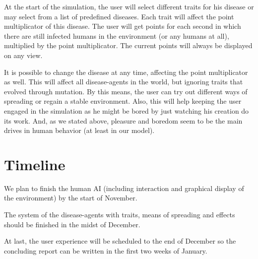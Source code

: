 \documentclass{acmtog} %
\begin{document}
At the start of the simulation, the user will select different traits for his disease or may select from a list of predefined diseases. Each trait will affect the point multiplicator of this disease. The user will get points for each second in which there are still infected humans in the environment (or any humans at all), multiplied by the point multiplicator. The current points will always be displayed on any view.

It is possible to change the disease at any time, affecting the point multiplicator as well. This will affect all disease-agents in the world, but ignoring traits that evolved through mutation. By this means, the user can try out different ways of spreading or regain a stable environment. Also, this will help keeping the user engaged in the simulation as he might be bored by just watching his creation do its work. And, as we stated above, pleasure and boredom seem to be the main drives in human behavior (at least in our model).

\section{Timeline}

We plan to finish the human AI (including interaction and graphical display of the environment) by the start of November.

The system of the disease-agents with traits, means of spreading and effects should be finished in the midst of December.

At last, the user experience will be scheduled to the end of December so the concluding report can be written in the first two weeks of January.
\end{document}
